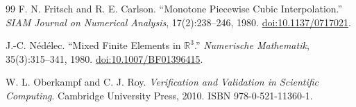 \begin{thebibliography}{99}
 F. N. Fritsch and R. E. Carlson. ``Monotone Piecewise Cubic Interpolation.'' \emph{SIAM Journal on Numerical Analysis}, 17(2):238--246, 1980. \href{https://doi.org/10.1137/0717021}{doi:10.1137/0717021}.

 J.-C. Nédélec. ``Mixed Finite Elements in $\mathbb{R}^3$.'' \emph{Numerische Mathematik}, 35(3):315--341, 1980. \href{https://doi.org/10.1007/BF01396415}{doi:10.1007/BF01396415}.

 W. L. Oberkampf and C. J. Roy. \emph{Verification and Validation in Scientific Computing}. Cambridge University Press, 2010. ISBN 978-0-521-11360-1.

\end{thebibliography}
